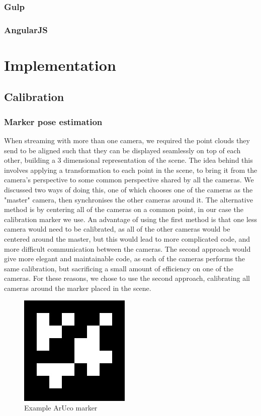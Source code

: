 \documentclass{article}
\begin{document}
\subsubsection{Gulp} %
\subsubsection{AngularJS}


\newpage
\section{Implementation}
\subsection{Calibration}
\subsubsection{Marker pose estimation}
When streaming with more than one camera, we required the point clouds they send to be aligned such that they can be displayed seamlessly on top of each other, building a 3 dimensional representation of the scene. The idea behind this involves applying a transformation to each point in the scene, to bring it from the camera's perspective to some common perspective shared by all the cameras. We discussed two ways of doing this, one of which chooses one of the cameras as the "master" camera, then synchronises the other cameras around it. The alternative method is by centering all of the cameras on a common point, in our case the calibration marker we use. An advantage of using the first method is that one less camera would need to be calibrated, as all of the other cameras would be centered around the master, but this would lead to more complicated code, and more difficult communication between the cameras. The second approach would give more elegant and maintainable code, as each of the cameras performs the same calibration, but sacrificing a small amount of efficiency on one of the cameras. For these reasons, we chose to use the second approach, calibrating all cameras around the marker placed in the scene. \\
\begin{figure}[h]
  \centering
  \includegraphics[scale=0.6]{aruco}
  \caption{Example ArUco marker}
\end{figure} \\
\end{document}
